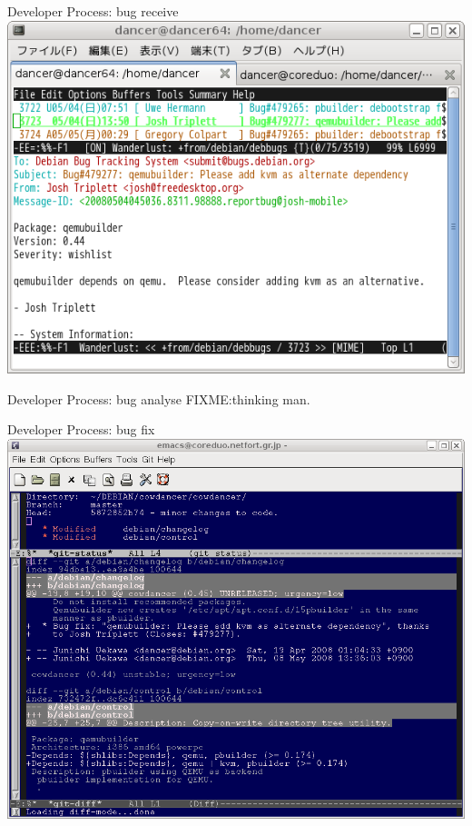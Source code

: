 \documentclass[cjk,dvipdfm,12pt]{beamer}
\begin{document}
\begin{frame}{Developer Process: bug receive}
 \includegraphics[width=1\hsize]{image200805/bug1.png}
\end{frame}

\begin{frame}{Developer Process: bug analyse}
FIXME:thinking man.
\end{frame}

\begin{frame}{Developer Process: bug fix}
 \includegraphics[width=1\hsize]{image200805/bug2.png}
\end{frame}
\end{document}
